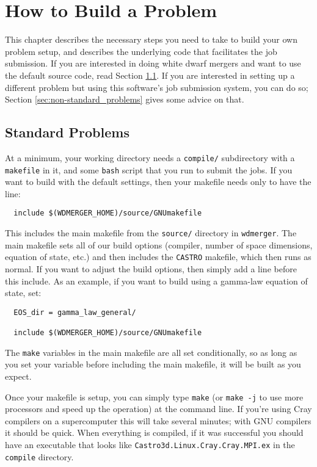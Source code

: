 \documentclass[12pt]{book}
\begin{document}
\chapter{How to Build a Problem}

This chapter describes the necessary steps you need to take to build your own problem setup,
and describes the underlying code that facilitates the job submission. If you are interested in
doing white dwarf mergers and want to use the default source code, read Section \ref{sec:standard_problems}.
If you are interested in setting up a different problem but using this software's job submission 
system, you can do so; Section \ref{sec:non-standard_problems} gives some advice on that.

\section{Standard Problems}
\label{sec:standard_problems}

At a minimum, your working directory needs a \texttt{compile/} subdirectory with a \texttt{makefile}
in it, and some \texttt{bash} script that you run to submit the jobs. If you want to build 
with the default settings, then your makefile needs only to have the line:
\begin{lstlisting}
  include $(WDMERGER_HOME)/source/GNUmakefile
\end{lstlisting}%
This includes the main makefile from the \texttt{source/} directory in \texttt{wdmerger}. 
The main makefile sets all of our build options (compiler, number of space dimensions, 
equation of state, etc.) and then includes the \texttt{CASTRO} makefile, which then runs as normal.
If you want to adjust the build options, then simply add a line before this include. As an 
example, if you want to build using a gamma-law equation of state, set:
\begin{lstlisting}
  EOS_dir = gamma_law_general/

  include $(WDMERGER_HOME)/source/GNUmakefile 
\end{lstlisting}%

The \texttt{make} variables in the main makefile are all set conditionally, so as long 
as you set your variable before including the main makefile, it will be built as you expect.

Once your makefile is setup, you can simply type \texttt{make} (or \texttt{make -j} 
to use more processors and speed up the operation) at the command line. 
If you're using Cray compilers on a supercomputer this will take several minutes;
with GNU compilers it should be quick. When everything is compiled, if it was
successful you should have an executable that looks like \texttt{Castro3d.Linux.Cray.Cray.MPI.ex}
in the \texttt{compile} directory.
\end{document}
